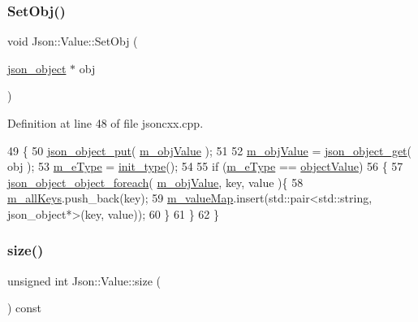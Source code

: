 \subsubsection{\texorpdfstring{Set\+Obj()}{SetObj()}}
{\footnotesize\ttfamily void Json\+::\+Value\+::\+Set\+Obj (\begin{DoxyParamCaption}\item[{\hyperlink{structjson__object}{json\+\_\+object} $\ast$}]{obj }\end{DoxyParamCaption})}



Definition at line 48 of file jsoncxx.\+cpp.


\begin{DoxyCode}
49     \{
50         \hyperlink{json__object_8c_a24340b9a57fb8c4df72915d001437202}{json\_object\_put}( \hyperlink{class_json_1_1_value_a3a705e06c2dbc4a6e142b58b0cbca57e}{m\_objValue} );
51 
52         \hyperlink{class_json_1_1_value_a3a705e06c2dbc4a6e142b58b0cbca57e}{m\_objValue} = \hyperlink{json__object_8c_ac09dff4e88b4d925c272b3b5061c0182}{json\_object\_get}( obj );
53         \hyperlink{class_json_1_1_value_ae6116e08a5c1833f858c1d29156365b1}{m\_eType} = \hyperlink{class_json_1_1_value_ad24bf765750e8ea535d28bcf981d551a}{init\_type}();
54 
55         \textcolor{keywordflow}{if} (\hyperlink{class_json_1_1_value_ae6116e08a5c1833f858c1d29156365b1}{m\_eType} == \hyperlink{namespace_json_a7d654b75c16a57007925868e38212b4eae8386dcfc36d1ae897745f7b4f77a1f6}{objectValue})
56         \{
57             \hyperlink{json__object_8h_acf5f514a9e0061c10fc08055762639ee}{json\_object\_object\_foreach}( \hyperlink{class_json_1_1_value_a3a705e06c2dbc4a6e142b58b0cbca57e}{m\_objValue}, key, value )\{
58                 \hyperlink{class_json_1_1_value_a914e4896d12ffa87726125d2f60ea9c0}{m\_allKeys}.push\_back(key);
59                 \hyperlink{class_json_1_1_value_a2b9203575d8ff75f02d30e09befb1204}{m\_valueMap}.insert(std::pair<std::string, json\_object*>(key, value));
60             \}
61         \}
62     \}
\end{DoxyCode}
\mbox{\label{class_json_1_1_value_a3cde6bd042f16442791fa816a60332e5}} 
\subsubsection{\texorpdfstring{size()}{size()}}
{\footnotesize\ttfamily unsigned int Json\+::\+Value\+::size (\begin{DoxyParamCaption}{ }\end{DoxyParamCaption}) const}




